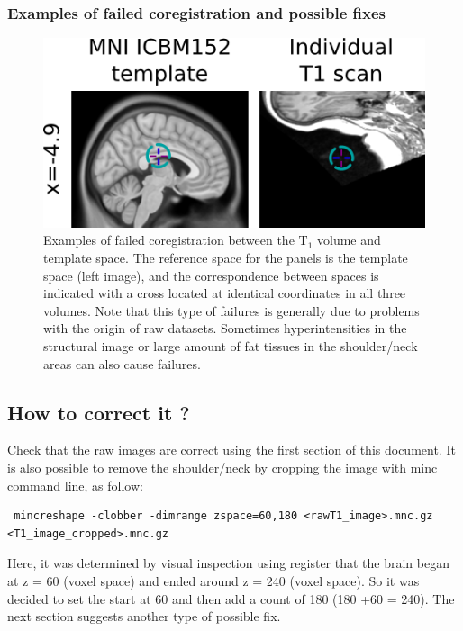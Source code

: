 \documentclass[12pt]{paper}%
\begin{document}
\newpage
\subsubsection{Examples of failed coregistration and possible fixes}
\label{sec-1}
\begin{figure}[h!tbp]
\begin{center}

\includegraphics[width=0.4\linewidth]{fig_qc_fail}
\end{center}
\caption{
{ Examples of failed coregistration between the T$_1$ volume and template space.} {The reference space for the panels is the template space (left image), and the correspondence between spaces is indicated with a cross located at identical coordinates in all three volumes. Note that this type of failures is generally due to problems with the origin of raw datasets. Sometimes hyperintensities in the structural image or large amount of fat tissues in the shoulder/neck areas can also cause failures.}
}
\label{fig_qc_fail}
\end{figure}

\subsection*{How to correct it ?}
 Check that the raw images are correct using the first section of this document. It is also possible to remove the shoulder/neck by cropping the image with minc command line, as follow:
\begin{lstlisting}
 mincreshape -clobber -dimrange zspace=60,180 <rawT1_image>.mnc.gz  <T1_image_cropped>.mnc.gz
\end{lstlisting}
 Here, it was determined by visual inspection using register that the brain began at z = 60 (voxel space) and ended around z = 240 (voxel space). So it was decided to set the start at 60 and then add a count of 180 (180 +60 = 240). The next section suggests another type of possible fix.
\end{document}
